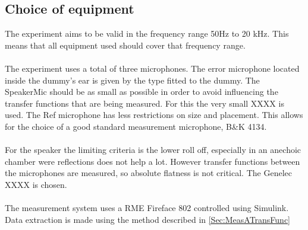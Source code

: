 \subsection{Choice of equipment}
The experiment aims to be valid in the frequency range 50Hz to 20 kHz. This means that all equipment used should cover that frequency range. \\\\
The experiment uses a total of three microphones. The error microphone located inside the dummy's ear is given by the type fitted to the dummy. The SpeakerMic should be as small as possible in order to avoid influencing the transfer functions that are being measured. For this the very small XXXX is used. The Ref microphone has less restrictions on size and placement. This allows for the choice of a good standard measurement microphone, B\&K 4134. \\\\
For the speaker the limiting criteria is the lower roll off, especially in an anechoic chamber were reflections does not help a lot. However transfer functions between the microphones are measured, so absolute flatness is not critical. The Genelec XXXX is chosen. \\\\
The measurement system uses a RME Fireface 802 controlled using Simulink. Data extraction is made using the method described in \autoref{Sec:MeasATransFunc}


